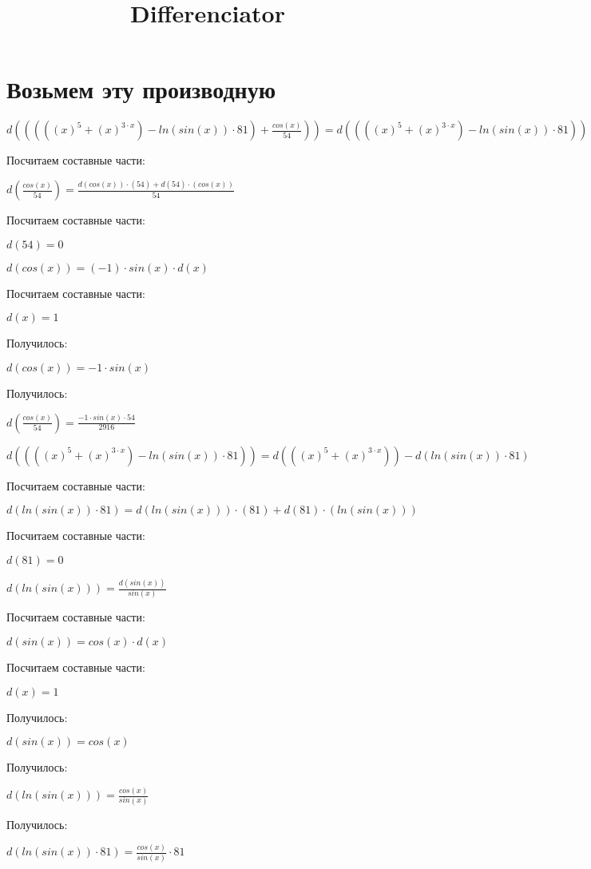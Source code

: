 \documentclass{article}
\title{Differenciator}
\begin{document}
\maketitle
\section{Возьмем эту производную}


$ d(((((x)^{5}+(x)^{3 \cdot x})-ln(sin(x)) \cdot 81)+\frac{cos(x)}{54})) = d((((x)^{5}+(x)^{3 \cdot x})-ln(sin(x)) \cdot 81)) + d(\frac{cos(x)}{54})$

Посчитаем составные части:

$ d(\frac{cos(x)}{54}) = \frac{d(cos(x)) \cdot (54) + d(54) \cdot (cos(x))}{54}$

Посчитаем составные части:

$ d(54) = 0$

$ d(cos(x)) = (-1) \cdot sin(x) \cdot d(x)$

Посчитаем составные части:

$ d(x) = 1$

Получилось:

$ d(cos(x)) = -1 \cdot sin(x)$

Получилось:

$ d(\frac{cos(x)}{54}) = \frac{-1 \cdot sin(x) \cdot 54}{2916}$

$ d((((x)^{5}+(x)^{3 \cdot x})-ln(sin(x)) \cdot 81)) = d(((x)^{5}+(x)^{3 \cdot x})) - d(ln(sin(x)) \cdot 81)$

Посчитаем составные части:

$ d(ln(sin(x)) \cdot 81) = d(ln(sin(x))) \cdot (81) + d(81) \cdot (ln(sin(x)))$

Посчитаем составные части:

$ d(81) = 0$

$ d(ln(sin(x))) = \frac{d(sin(x))}{sin(x)}$

Посчитаем составные части:

$ d(sin(x)) = cos(x) \cdot d(x)$

Посчитаем составные части:

$ d(x) = 1$

Получилось:

$ d(sin(x)) = cos(x)$

Получилось:

$ d(ln(sin(x))) = \frac{cos(x)}{sin(x)}$

Получилось:

$ d(ln(sin(x)) \cdot 81) = \frac{cos(x)}{sin(x)} \cdot 81$
\end{document}
